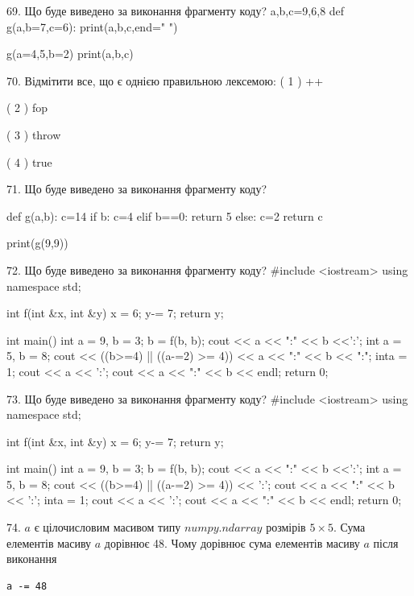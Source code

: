 \documentclass[11pt]{article}
\begin{document}

69. Що буде виведено за виконання фрагменту коду?
a,b,c=9,6,8
def g(a,b=7,c=6):
    print(a,b,c,end=" ")

g(a=4,5,b=2)
print(a,b,c)


70. %
Відмітити все, що є однією правильною лексемою:
( 1 ) ++

( 2 ) fop

( 3 ) throw

( 4 ) true


71. Що буде виведено за виконання фрагменту коду?

def g(a,b):
    c=14
    if b:
        c=4
    elif b==0:
         return 5
    else: 
        c=2
    return c

print(g(9,9))


72. Що буде виведено за виконання фрагменту коду?
#include <iostream>
using namespace std;

int f(int &x, int &y){
    x = 6;
    y-= 7;
    return y;
}

int main(){
    int a = 9, b = 3;
    b = f(b, b);
    cout << a << ":" << b <<':';
    {
        int a = 5, b = 8;
        cout << ((b>=4) || ((a-=2) >= 4))
             << a << ":" << b << ":";
    }
    {
        inta = 1;
        cout << a << ':';
    }
    cout << a << ":" << b << endl;
    return 0;
}



73. Що буде виведено за виконання фрагменту коду?
#include <iostream>
using namespace std;

int f(int &x, int &y){
    x = 6;
    y-= 7;
    return y;
}

int main(){
    int a = 9, b = 3;
    b = f(b, b);
    cout << a << ":" << b <<':';
    {
        int a = 5, b = 8;
        cout << ((b>=4) || ((a-=2) >= 4)) << ':';
        cout << a << ":" << b << ':';
    }
    {
        inta = 1;
        cout << a << ':';
    }
    cout << a << ":" << b << endl;
    return 0;
}



74. 
$a$ є цілочисловим масивом типу $numpy.ndarray$ розмірів $5{\times}5$. Сума елементів масиву $a$ дорівнює 48. Чому дорівнює сума елементів масиву $a$ після виконання 
\begin{verbatim}
a -= 48
\end{verbatim}
\end{document}
